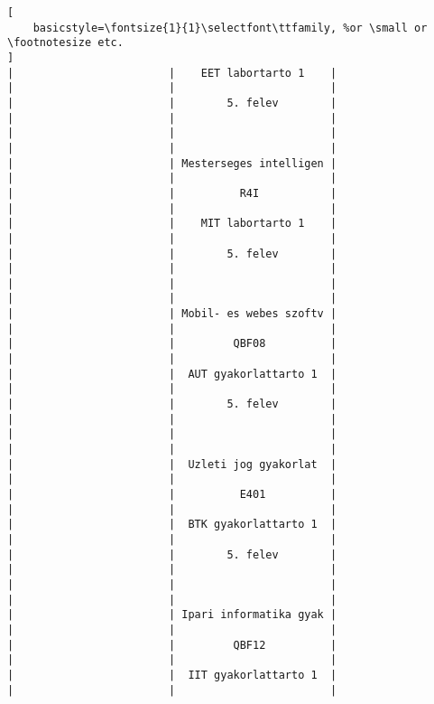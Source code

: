 \begin{lstlisting}[
    basicstyle=\fontsize{1}{1}\selectfont\ttfamily, %or \small or \footnotesize etc.
]
|                        |    EET labortarto 1    |                        |                        |                        | 
|                        |        5. felev        |                        |                        |                        | 
|                        |                        |                        |                        |                        | 
|                        | Mesterseges intelligen |                        |                        |                        | 
|                        |          R4I           |                        |                        |                        | 
|                        |    MIT labortarto 1    |                        |                        |                        | 
|                        |        5. felev        |                        |                        |                        | 
|                        |                        |                        |                        |                        | 
|                        | Mobil- es webes szoftv |                        |                        |                        | 
|                        |         QBF08          |                        |                        |                        | 
|                        |  AUT gyakorlattarto 1  |                        |                        |                        | 
|                        |        5. felev        |                        |                        |                        | 
|                        |                        |                        |                        |                        | 
|                        |  Uzleti jog gyakorlat  |                        |                        |                        | 
|                        |          E401          |                        |                        |                        | 
|                        |  BTK gyakorlattarto 1  |                        |                        |                        | 
|                        |        5. felev        |                        |                        |                        | 
|                        |                        |                        |                        |                        | 
|                        | Ipari informatika gyak |                        |                        |                        | 
|                        |         QBF12          |                        |                        |                        | 
|                        |  IIT gyakorlattarto 1  |                        |                        |                        | 

\end{lstlisting}

